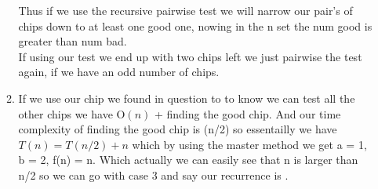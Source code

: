 \documentclass{article}
\begin{document}
\begin{enumerate}
\begin{enumerate}
          Thus if we use the recursive pairwise test we will narrow our pair's of chips down to at least one good one, nowing in the n set the num good is greater than num bad. \\

          If using our test we end up with two chips left we just pairwise the test again, if we have an odd number of chips. 

          \item If we use our chip we found in question to to know we can test all the other chips we have $\textrm{O}(n)$ + finding the good chip. 
          And our time complexity of finding the good chip is (n/2) so essentailly we have $T(n) = T(n/2) + n$ which by using the master method we get a = 1, b = 2, f(n) = n. Which actually we can easily see that n is larger than n/2 so we can go with case 3 and say our recurrence is .

        \end{enumerate}
  \end{enumerate}
\end{document}
